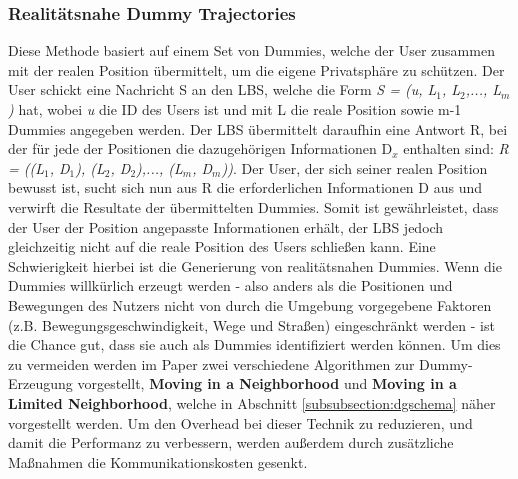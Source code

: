 \subsubsection{Realitätsnahe Dummy Trajectories \cite{Kido2005}} \label{subsubsection:realdummy}
Diese Methode basiert auf einem Set von Dummies, welche der User zusammen mit der realen Position übermittelt, um die eigene Privatsphäre zu schützen. Der User schickt eine Nachricht S an den LBS, welche die Form \textit{S = (u, L$_{1}$, L$_{2}$,..., L$_{m}$)} hat, wobei \textit{u} die ID des Users ist und mit L die reale Position sowie m-1 Dummies angegeben werden. Der LBS übermittelt daraufhin eine Antwort R, bei der für jede der Positionen die dazugehörigen Informationen D$_{x}$ enthalten sind: \textit{R = ((L$_{1}$, D$_{1}$), (L$_{2}$, D$_{2}$),..., (L$_{m}$, D$_{m}$))}. Der User, der sich seiner realen Position bewusst ist, sucht sich nun aus R die erforderlichen Informationen D aus und verwirft die Resultate der übermittelten Dummies. Somit ist gewährleistet, dass der User der Position angepasste Informationen erhält, der LBS jedoch gleichzeitig nicht auf die reale Position des Users schließen kann.
Eine Schwierigkeit hierbei ist die Generierung von realitätsnahen Dummies. Wenn die Dummies willkürlich erzeugt werden - also anders als die Positionen und Bewegungen des Nutzers nicht von durch die Umgebung vorgegebene Faktoren (z.B. Bewegungsgeschwindigkeit, Wege und Straßen) eingeschränkt werden - ist die Chance gut, dass sie auch als Dummies identifiziert werden können. Um dies zu vermeiden werden im Paper zwei verschiedene Algorithmen zur Dummy-Erzeugung vorgestellt, \textbf{Moving in a Neighborhood} und \textbf{Moving in a Limited Neighborhood}, welche in Abschnitt \ref{subsubsection:dgschema} näher vorgestellt werden.
Um den Overhead bei dieser Technik zu reduzieren, und damit die Performanz zu verbessern, werden außerdem durch zusätzliche Maßnahmen die Kommunikationskosten gesenkt.

